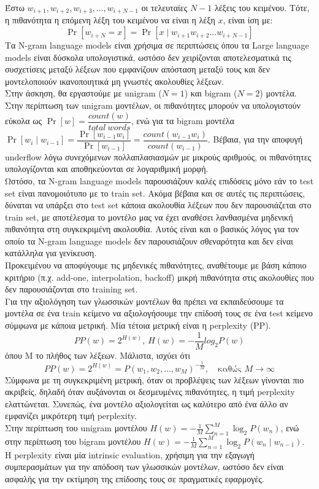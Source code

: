 \documentclass{article}
\begin{document}
Έστω $w_{i+1}, w_{i+2}, w_{i+3}, ..., w_{i+N-1}$ οι τελευταίες $N-1$ λέξεις του κειμένου. Τότε, η πιθανότητα η επόμενη λέξη του κειμένου να είναι η λέξη $x$, είναι ίση με:
%
\[
\Pr[w_{i+N}=x]=\Pr[x \mid w_{i+1}w_{i+2}...w_{i+N-1}]
\]
%
Τα N-gram language models είναι χρήσιμα σε περιπτώσεις όπου τα Large language models είναι δύσκολα υπολογιστικά, ωστόσο δεν χειρίζονται αποτελεσματικά τις συσχετίσεις μεταξύ λέξεων που εμφανίζουν απόσταση μεταξύ τους και δεν μοντελοποιούν ικανοποιητικά μη γνωστές ακολουθίες λέξεων.
\\[1.5mm]
Στην άσκηση, θα εργαστούμε με unigram ($N=1$) και bigram ($N=2$) μοντέλα.
\\[1.5mm]
Στην περίπτωση των unigram μοντέλων, οι πιθανότητες μπορούν να υπολογιστούν εύκολα ως $\Pr[w]=\dfrac{count(w)}{total \ words}$, ενώ για τα bigram μοντέλα $\Pr[w_{i} \mid w_{i-1}]=\dfrac{\Pr[w_{i-1}w_{i}]}{\Pr[w_{i-1}]}=\dfrac{count(w_{i-1}w_{i})}{count(w_{i-1})}$. Βέβαια, για την αποφυγή underflow λόγω συνεχόμενων πολλαπλασιασμών με μικρούς αριθμούς, οι πιθανότητες υπολογίζονται και αποθηκεύονται σε λογαριθμική μορφή.
\\[1.5mm]
Ωστόσο, τα N-gram language models παρουσιάζουν καλές επιδόσεις μόνο εάν το test set είναι πανομοιότυπο με το train set. Ακόμα βέβαια και σε αυτές τις περιπτώσεις, δύναται να υπάρξει στο test set κάποια ακολουθία λέξεων που δεν παρουσιάζεται στο train set, με αποτέλεσμα το μοντέλο μας να έχει αναθέσει λανθασμένα μηδενική πιθανότητα στη συγκεκριμένη ακολουθία. Αυτός είναι και ο βασικός λόγος για τον οποίο τα N-gram language models δεν παρουσιάζουν σθεναρότητα και δεν είναι κατάλληλα για γενίκευση.
\\[1.5mm]
Προκειμένου να αποφύγουμε τις μηδενικές πιθανότητες, αναθέτουμε με βάση κάποιο κριτήριο (π.χ. add-one, interpolation, backoff) μικρή πιθανότητα στις ακολουθίες που δεν παρουσιάζονται στο training set.
\\[1.5mm]
\label{perplexity}
Για την αξιολόγηση των γλωσσικών μοντέλων θα πρέπει να εκπαιδεύσουμε τα μοντέλα σε ένα train κείμενο να αξιολογήσουμε την επίδοσή τους σε ένα test κείμενο σύμφωνα με κάποια μετρική. Μία τέτοια μετρική είναι η perplexity (PP).
%
\[
PP(w) = 2^{H(w)}, \ H(w) =- \dfrac{1}{M} log_2P(w)
\]
%
όπου Μ το πλήθος των λέξεων. Μάλιστα, ισχύει ότι
%
\[
PP(w) = 2^{H(w)} = P(w_1, w_2, \ldots, w_M)^{-\frac{1}{M}}, \quad \text{καθώς } M \to \infty
\]
%
Σύμφωνα με τη συγκεκριμένη μετρική, όταν οι προβλέψεις των λέξεων γίνονται πιο ακριβείς, δηλαδή όταν αυξάνονται οι δεσμευμένες πιθανότητες, η τιμή perplexity ελαττώνεται. Συνεπώς, ένα μοντέλο αξιολογείται ως καλύτερο από ένα άλλο αν εμφανίζει μικρότερη τιμή perplexity.
\\[1.5mm]
Στην περίπτωση του unigram μοντέλου $
H(w) = -\frac{1}{M} \sum_{n=1}^{M} \log_2 P(w_n)$, ενώ στην περίπτωση του bigram μοντέλου $H(w) = -\frac{1}{M} \sum_{n=1}^{M} \log_2 P(w_n \mid w_{n-1})$.
\\[1.5mm]
Η perplexity είναι μία intrinsic evaluation, χρήσιμη για την εξαγωγή συμπερασμάτων για την απόδοση των γλωσσικών μοντέλων, ωστόσο δεν είναι ασφαλής για την εκτίμηση της επίδοσης τους σε πραγματικές εφαρμογές.
%
%
%
%
%
%
%
%
\end{document}
